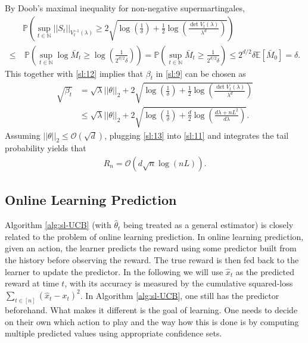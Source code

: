 \documentclass[letterpaper,11pt,openright,openany]{book}
\numberwithin{equation}{section}
\theoremstyle{plain}
\theoremstyle{definition}
\def\N{{\mathbb N}}
\def\E{{\mathbb E}}
\def\P{{\mathbb P}}
\def\t{{\theta}}
\begin{document}
By Doob's maximal inequality for non-negative supermartingales, 
\begin{align*}
&\P\left(\sup_{t\in\N}||S_t||_{V^{-1}_t(\lambda)}\geq 2\sqrt{\log\left(\frac{1}{\delta}\right)+\frac{1}{2}\log\left(\frac{\det V_t(\lambda)}{\lambda^d}\right)}\right)\\
\leq&\ \P\left(\sup_{t\in\N}\log\bar{M}_t\geq\log\left(\frac{1}{2^{d/2}\delta}\right)\right) = \P\left(\sup_{t\in\N}\bar{M}_t\geq \frac{1}{2^{d/2}\delta}\right)\leq 2^{d/2}\delta\E[\bar{M}_0]=\delta. 
\end{align*}
This together with \eqref{sl:12} implies that $\beta_t$ in \eqref{sl:9} can be chosen as 
\begin{align}
\sqrt{\beta_t} &= \sqrt{\lambda}||\t||_2+2\sqrt{\log\left(\frac{1}{\delta}\right)+\frac{1}{2}\log\left(\frac{\det V_t(\lambda)}{\lambda^d}\right)}\nonumber\\
&\leq\sqrt{\lambda}||\t||_2+2\sqrt{\log\left(\frac{1}{\delta}\right)+\frac{d}{2}\log\left(\frac{d\lambda+nL^2}{d\lambda}\right)}\label{sl:13}.
\end{align}
Assuming $||\t||_2\leq\mathcal O(\sqrt{d})$, plugging \eqref{sl:13} into \eqref{sl:11} and integrates the tail probability yields that 
\begin{align*}
R_n = \mathcal O \left(d\sqrt{n}\log (nL)\right).
\end{align*}

\subsection{Online Learning Prediction}\label{sec:olp}

Algorithm \ref{alg:sl-UCB} (with $\hat{\t}_t$ being treated as a general estimator) is closely related to the problem of online learning prediction. 
In online learning prediction, given an action, the learner predicts the reward using some predictor built from the history before observing the reward. 
The true reward is then fed back to the learner to update the predictor. 
In the following we will use $\hat{x}_t$ as the predicted reward at time $t$, with its accuracy is measured by the cumulative squared-loss $\sum_{t\in [n]}(\hat{x}_t-x_t)^2$. 
In Algorithm \ref{alg:sl-UCB}, one still has the predictor beforehand. What makes it different is the goal of learning. One needs to decide on their own which action to play and the way how this is done is by computing multiple predicted values using appropriate confidence sets. 
\end{document}
